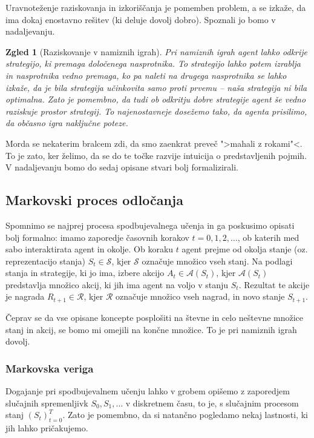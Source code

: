 \documentclass[12pt,a4paper]{amsart}
\theoremstyle{definition} %
\theoremstyle{plain} %
\newtheorem{zgled}[definicija]{Zgled}
\begin{document}
Uravnoteženje raziskovanja in izkoriščanja je pomemben problem, a se izkaže, da ima dokaj enostavno
rešitev (ki deluje dovolj dobro). Spoznali jo bomo v nadaljevanju.

\begin{zgled}[Raziskovanje v namiznih igrah]
    Pri namiznih igrah agent lahko odkrije strategijo, ki premaga določenega nasprotnika. To strategijo
    lahko potem izrablja in nasprotnika vedno premaga, ko pa naleti na drugega nasprotnika se lahko izkaže, 
    da je bila strategija učinkovita samo proti prvemu -- naša strategija ni bila optimalna. Zato je 
    pomembno, da tudi ob odkritju dobre strategije agent še vedno raziskuje prostor strategij. To 
    najenostavneje dosežemo tako, da agenta prisilimo, da občasno igra naključne poteze.
\end{zgled}

Morda se nekaterim bralcem zdi, da smo zaenkrat preveč ">mahali z rokami"<. To je zato, ker želimo, 
da se do te točke razvije intuicija o predstavljenih pojmih. V nadaljevanju bomo do sedaj opisane 
stvari bolj formalizirali.


\subsection{Markovski proces odločanja}
Spomnimo se najprej procesa spodbujevalnega učenja in ga poskusimo opisati bolj formalno: 
imamo zaporedje časovnih korakov $t = 0, 1, 2, \dots$, ob katerih med sabo interaktirata agent 
in okolje. Ob koraku $t$ agent prejme od okolja stanje (oz. reprezentacijo stanja) $S_t \in 
\mathcal{S}$, kjer $\mathcal{S}$ označuje množico vseh stanj. Na podlagi stanja in strategije, 
ki jo ima, izbere akcijo $A_t \in \mathcal{A}(S_t)$, kjer $\mathcal{A}(S_t)$ predstavlja 
množico akcij, ki jih ima agent na voljo v stanju $S_t$. Rezultat te akcije je nagrada $R_{t+1} 
\in \mathcal{R}$, kjer $\mathcal{R}$ označuje množico vseh nagrad, in novo stanje $S_{t+1}$.

Čeprav se da vse opisane koncepte posplošiti na števne in celo neštevne množice stanj in akcij, 
se bomo mi omejili na končne množice. To je pri namiznih igrah dovolj.

\subsubsection{Markovska veriga}
Dogajanje pri spodbujevalnem učenju lahko v grobem opišemo z zaporedjem slučajnih spremenljivk $S_0,
S_1, \dots$ v diskretnem času, to je, s slučajnim procesom stanj $(S_t)_{t=0}^T$. Zato je pomembno, 
da si natančno pogledamo nekaj lastnosti, ki jih lahko pričakujemo. 
\end{document}
